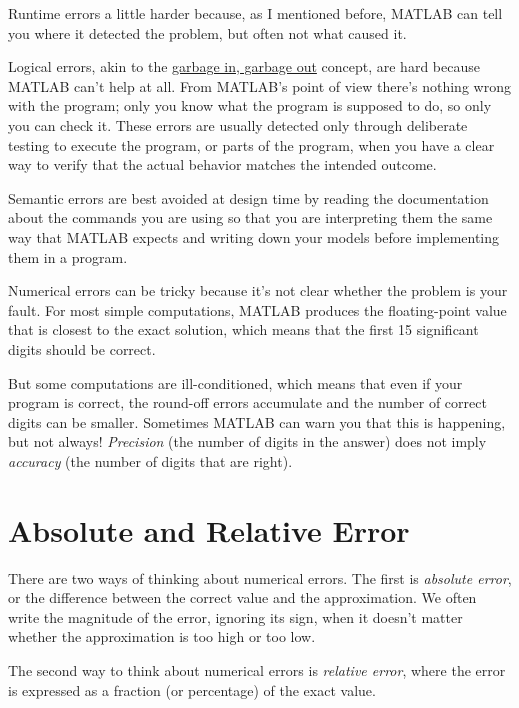 \documentclass[../../book.tex]{subfiles}
\begin{document}
Runtime errors a little harder because, as I mentioned before, MATLAB can tell you where it detected the problem, but often not what caused it.

Logical errors, akin to the \href{https://en.wikipedia.org/wiki/Garbage_in,_garbage_out}{garbage in, garbage out} concept, are hard because MATLAB can't help at all. From MATLAB's point of view there's nothing wrong with the program; only you know what the program is supposed to do, so only you can check it.  These errors are usually detected only through deliberate testing to execute the program, or parts of the program, when you have a clear way to verify that the actual behavior matches the intended outcome.

Semantic errors are best avoided at design time by reading the documentation about the commands you are using so that you are interpreting them the same way that MATLAB expects and writing down your models before implementing them in a program.

Numerical errors can be tricky because it's not clear whether the problem is your fault.  For most simple computations, MATLAB produces the floating-point value that is closest to the exact solution, which means that the first 15 significant digits should be correct.

But some computations are ill-conditioned, which means that even if your program is correct, the round-off errors accumulate and the number of correct digits can be smaller.  Sometimes MATLAB can warn you that this is happening, but not always!  \emph{Precision} (the number of digits in the answer) does not imply \emph{accuracy} (the number of digits that are right).


\section{Absolute and Relative Error}

There are two ways of thinking about numerical errors.
The first is \emph{absolute error}, or the difference between the correct value and the approximation.  We often write the magnitude of the error,
ignoring its sign, when it doesn't matter whether the approximation
is too high or too low.
 

The second way to think about numerical errors is \emph{relative error}, where the error is expressed as a fraction (or percentage) of the exact value.
\end{document}
